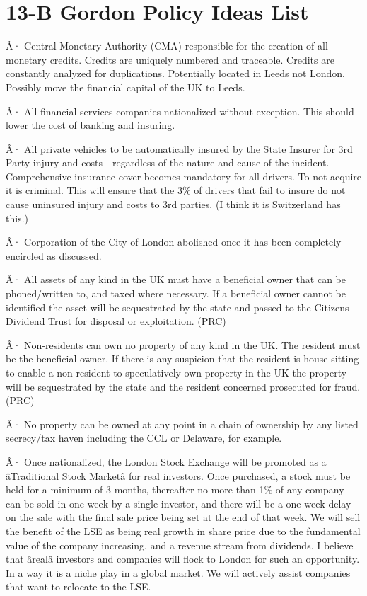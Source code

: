 \documentclass[]{tufte-handout}
\begin{document}
\hypertarget{b-gordon-policy-ideas-list}{%
\section{13-B Gordon Policy Ideas
List}\label{b-gordon-policy-ideas-list}}

Â· Central Monetary Authority (CMA) responsible for the creation of all
monetary credits. Credits are uniquely numbered and traceable. Credits
are constantly analyzed for duplications. Potentially located in Leeds
not London. Possibly move the financial capital of the UK to Leeds.

Â· All financial services companies nationalized without exception. This
should lower the cost of banking and insuring.

Â· All private vehicles to be automatically insured by the State Insurer
for 3rd Party injury and costs - regardless of the nature and cause of
the incident. Comprehensive insurance cover becomes mandatory for all
drivers. To not acquire it is criminal. This will ensure that the 3\% of
drivers that fail to insure do not cause uninsured injury and costs to
3rd parties. (I think it is Switzerland has this.)

Â· Corporation of the City of London abolished once it has been
completely encircled as discussed.

Â· All assets of any kind in the UK must have a beneficial owner that
can be phoned/written to, and taxed where necessary. If a beneficial
owner cannot be identified the asset will be sequestrated by the state
and passed to the Citizens Dividend Trust for disposal or exploitation.
(PRC)

Â· Non-residents can own no property of any kind in the UK. The resident
must be the beneficial owner. If there is any suspicion that the
resident is house-sitting to enable a non-resident to speculatively own
property in the UK the property will be sequestrated by the state and
the resident concerned prosecuted for fraud. (PRC)

Â· No property can be owned at any point in a chain of ownership by any
listed secrecy/tax haven including the CCL or Delaware, for example.

Â· Once nationalized, the London Stock Exchange will be promoted as a
âTraditional Stock Marketâ for real investors. Once purchased, a
stock must be held for a minimum of 3 months, thereafter no more than
1\% of any company can be sold in one week by a single investor, and
there will be a one week delay on the sale with the final sale price
being set at the end of that week. We will sell the benefit of the LSE
as being real growth in share price due to the fundamental value of the
company increasing, and a revenue stream from dividends. I believe that
ârealâ investors and companies will flock to London for such an
opportunity. In a way it is a niche play in a global market. We will
actively assist companies that want to relocate to the LSE.
\end{document}
